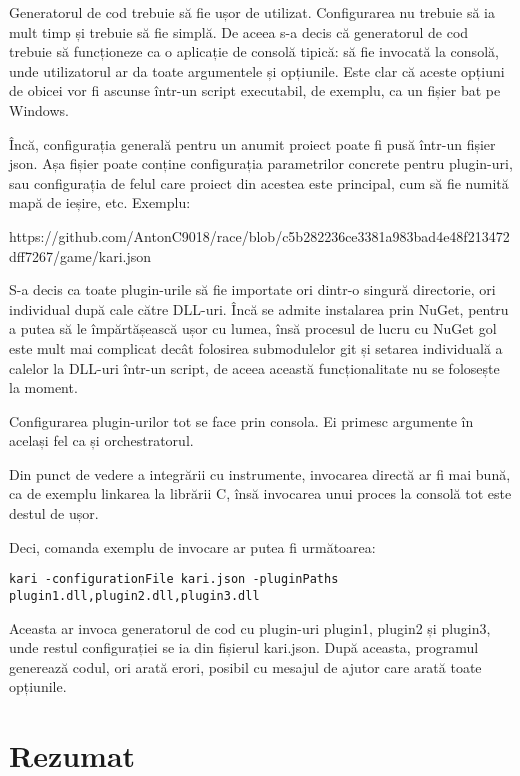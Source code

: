 \documentclass[a4paper,12pt]{report}
\begin{document}
Generatorul de cod trebuie să fie ușor de utilizat.
Configurarea nu trebuie să ia mult timp și trebuie să fie simplă.
De aceea s-a decis că generatorul de cod trebuie să funcționeze ca o aplicație de consolă tipică: să fie invocată la consolă, unde utilizatorul ar da toate argumentele și opțiunile.
Este clar că aceste opțiuni de obicei vor fi ascunse într-un script executabil, de exemplu, ca un fișier bat pe Windows.

Încă, configurația generală pentru un anumit proiect poate fi pusă într-un fișier json.
Așa fișier poate conține configurația parametrilor concrete pentru plugin-uri, sau configurația de felul care proiect din acestea este principal, cum să fie numită mapă de ieșire, etc. Exemplu:

https://github.com/AntonC9018/race/blob/c5b282236ce3381a983bad4e48f213472dff7267/game/kari.json


S-a decis ca toate plugin-urile să fie importate ori dintr-o singură directorie, ori individual după cale către DLL-uri.
Încă se admite instalarea prin NuGet, pentru a putea să le împărtășească ușor cu lumea, însă procesul de lucru cu NuGet gol este mult mai complicat decât folosirea submodulelor git și setarea individuală a calelor la DLL-uri într-un script, de aceea această funcționalitate nu se folosește la moment.

Configurarea plugin-urilor tot se face prin consola.
Ei primesc argumente în același fel ca și orchestratorul.

Din punct de vedere a integrării cu instrumente, invocarea directă ar fi mai bună, ca de exemplu linkarea la librării C, însă invocarea unui proces la consolă tot este destul de ușor.

Deci, comanda exemplu de invocare ar putea fi următoarea:

\begin{verbatim}
kari -configurationFile kari.json -pluginPaths plugin1.dll,plugin2.dll,plugin3.dll
\end{verbatim}

Aceasta ar invoca generatorul de cod cu plugin-uri plugin1, plugin2 și plugin3, unde restul configurației se ia din fișierul kari.json.
După aceasta, programul generează codul, ori arată erori, posibil cu mesajul de ajutor care arată toate opțiunile.


\section{Rezumat}
\end{document}
